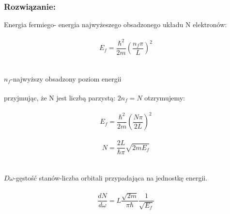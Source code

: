 \subsubsection*{Rozwiązanie:}
Energia fermiego- energia najwyżeszego obsadzonego układu N elektronów:
\\
\\
\begin{equation}
E_f=\frac{\hbar^2}{2m}(\frac{n_f\pi}{L})^2
\end{equation}
\\
\\
$n_f$-najwyższy obsadzony poziom energii
\\
\\
przyjmując, że N jest liczbą parzystą: $2n_f=N$ otzrymujemy:
\\
\\
\begin{equation}
E_f=\frac{\hbar^2}{2m}(\frac{N\pi}{2L})^2
\end{equation}
\\
\begin{equation}
N=\frac{2L}{\hbar \pi}\sqrt{2mE_f}
\end{equation}
\\
\\
$D{\omega}$-gęstość stanów-liczba orbitali przypadająca na jednostkę energii.
\\
\\
\begin{equation}
\frac{dN}{d\omega}=L\frac{\sqrt{2m}}{\pi \hbar}\frac{1}{\sqrt{E_f}}
\end{equation}
